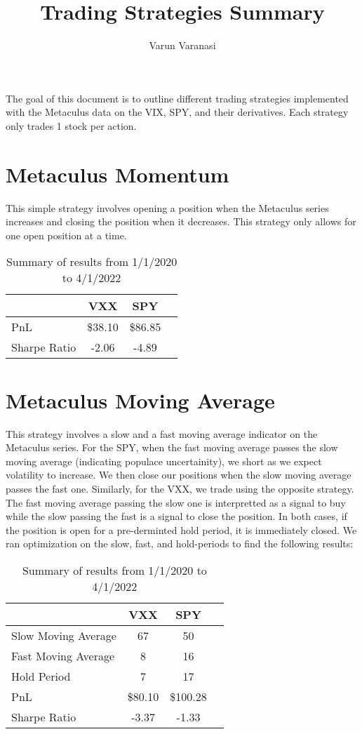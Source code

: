 \documentclass{article}
\title{Trading Strategies Summary}
\author{Varun Varanasi}
\begin{document}
\maketitle

The goal of this document is to outline different trading strategies implemented with the Metaculus data on the VIX, SPY, and their derivatives. Each strategy only trades 1 stock per action. 

\section*{Metaculus Momentum}
This simple strategy involves opening a position when the Metaculus series increases and closing the position when it decreases. This strategy only allows for one open position at a time.

\begin{table}[h]
\centering

\begin{tabular}{l||ccc}
    \toprule
     & \textbf{VXX} & \textbf{SPY} & \\
    \midrule
    PnL & \$38.10 & \$86.85 \\
    Sharpe Ratio & -2.06 & -4.89\\
    \bottomrule
\end{tabular}
\caption{Summary of results from 1/1/2020 to 4/1/2022}
\end{table}

\section*{Metaculus Moving Average}
This strategy involves a slow and a fast moving average indicator on the Metaculus series. For the SPY, when the fast moving average passes the slow moving average (indicating populace uncertainity), we short as we expect volatility to increase. We then close our positions when the slow moving average passes the fast one.
Similarly, for the VXX, we trade using the opposite strategy. The fast moving average passing the slow one is interpretted as a signal to buy while the slow passing the fast is a signal to close the position. In both cases, if the position is open for a pre-derminted hold period, it is immediately closed. We ran optimization on the slow, fast, and hold-periods to find the following results:

\begin{table}[h]
    \centering
    
    \begin{tabular}{l||ccc}
        \toprule
         & \textbf{VXX} & \textbf{SPY} & \\
        \midrule
        Slow Moving Average & 67  & 50\\
        Fast Moving Average & 8  & 16\\
        Hold Period & 7  & 17\\
        PnL & \$80.10 & \$100.28 \\
        Sharpe Ratio & -3.37 & -1.33\\
        \bottomrule
    \end{tabular}
    \caption{Summary of results from 1/1/2020 to 4/1/2022}
    \end{table}
\end{document}
